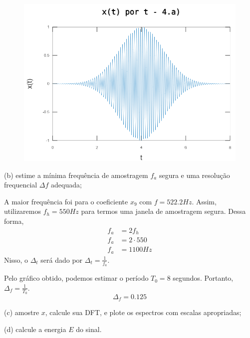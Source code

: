 \documentclass[10pt]{article}
\begin{document}
\begin{figure}[h]
    \includegraphics[scale=0.6]{questao4a}
    \centering
\end{figure}

(b) estime a mínima frequência de amostragem $f_a$ segura e uma resolução frequencial $\Delta f$ adequada;

A maior frequência foi para o coeficiente $x_9$ com $f = 522.2 Hz$. Assim, utilizaremos $f_h = 550 Hz$ para termos uma janela de amostragem segura. Dessa forma,
\begin{align*}
    f_a &= 2f_h\\
    f_a &= 2 \cdot 550\\
    f_a &= 1100 Hz
\end{align*}
Nisso, o $\Delta_t$ será dado por $\Delta_t = \frac{1}{f_a}$.

Pelo gráfico obtido, podemos estimar o período $T_0 = 8$ segundos. Portanto, $\Delta_f = \frac{1}{T_0}$.
\[\Delta_f = 0.125\]

(c) amostre $x$, calcule sua DFT, e plote os espectros com escalas apropriadas;

(d) calcule a energia $E$ do sinal.
\end{document}
